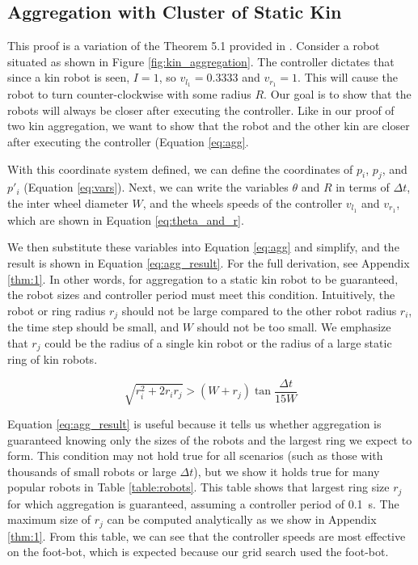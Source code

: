 \documentclass[conference]{IEEEtran}
\begin{document}
  \subsection{Aggregation with Cluster of Static Kin}

    This proof is a variation of the Theorem 5.1 provided in \cite{gauci_self-organized_2014}. Consider a robot situated as shown in Figure \ref{fig:kin_aggregation}. The controller dictates that since a kin robot is seen, $I=1$, so $v_{l_1} = 0.3333$ and $v_{r_1} = 1$. This will cause the robot to turn counter-clockwise with some radius $R$. Our goal is to show that the robots will always be closer after executing the controller. Like in our proof of two kin aggregation, we want to show that the robot and the other kin are closer after executing the controller (Equation \eqref{eq:agg}.

    With this coordinate system defined, we can define the coordinates of $p_i$, $p_j$, and $p'_i$ (Equation \eqref{eq:vars}). Next, we can write the variables $\theta$ and $R$ in terms of $\Delta t$, the inter wheel diameter $W$, and the wheels speeds of the controller $v_{l_1}$ and $v_{r_1}$, which are shown in Equation \eqref{eq:theta_and_r}.

    We then substitute these variables into Equation \eqref{eq:agg} and simplify, and the result is shown in Equation \eqref{eq:agg_result}. For the full derivation, see Appendix \ref{thm:1}. In other words, for aggregation to a static kin robot to be guaranteed, the robot sizes and controller period must meet this condition. Intuitively, the robot or ring radius $r_j$ should not be large compared to the other robot radius $r_i$, the time step should be small, and $W$ should not be too small. We emphasize that $r_j$ could be the radius of a single kin robot or the radius of a large static ring of kin robots.

    \begin{equation} \label{eq:agg_result}
      \sqrt{r^2_i + 2r_ir_j} > (W+r_j)\tan{\frac{\Delta t}{15W}}
    \end{equation}

    Equation \eqref{eq:agg_result} is useful because it tells us whether aggregation is guaranteed knowing only the sizes of the robots and the largest ring we expect to form. This condition may not hold true for all scenarios (such as those with thousands of small robots or large $\Delta t$), but we show it holds true for many popular robots in Table \ref{table:robots}. This table shows that largest ring size $r_j$ for which aggregation is guaranteed, assuming a controller period of \SI{0.1}{\second}. The maximum size of $r_j$ can be computed analytically as we show in Appendix \ref{thm:1}. From this table, we can see that the controller speeds are most effective on the foot-bot, which is expected because our grid search used the foot-bot.
\end{document}
